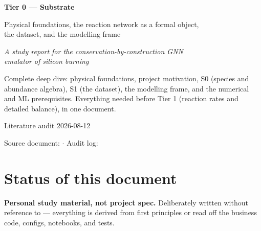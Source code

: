 
\begin{titlepage}
\centering
\vspace*{3.5cm}

{\Huge\bfseries Tier 0 --- Substrate\par}

\vspace{1.2em}
{\Large Physical foundations, the reaction network as a formal object,\\[0.3em]
the dataset, and the modelling frame\par}

\vspace{0.8em}
{\large\itshape A study report for the conservation-by-construction GNN\\
emulator of silicon burning\par}

\vspace{3em}
\begin{minipage}{0.82\textwidth}
\small
Complete deep dive: physical foundations, project motivation, S0 (species and
abundance algebra), S1 (the dataset), the modelling frame, and the numerical
and ML prerequisites. Everything needed before Tier 1 (reaction rates and
detailed balance), in one document.
\end{minipage}

\vfill
{\small Literature audit 2026-08-12\par}
\vspace{0.5em}
{\small Source document:  \quad$\cdot$\quad
Audit log: \par}
\end{titlepage}

\section*{Status of this document}
\label{sec:status}

\begin{warn}
\textbf{Personal study material, not project spec.} Deliberately written
without reference to  --- everything is derived from first
principles or read off the business code, configs, notebooks, and tests.
\end{warn}

